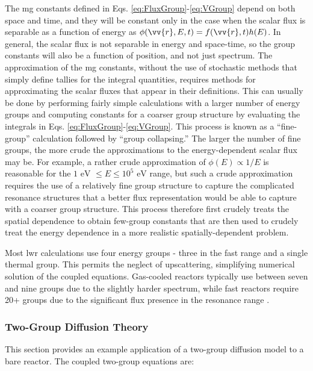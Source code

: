 The \gls{mg} constants defined in Eqs. \eqref{eq:FluxGroup}-\eqref{eq:VGroup} depend on both space and time, and they will be constant only in the case when the scalar flux is separable as a function of energy as \(\phi(\vv{r},E,t)=f(\vv{r},t)h(E)\). In general, the scalar flux is not separable in energy and space-time, so the group constants will also be a function of position, and not just spectrum. The approximation of the \gls{mg} constants, without the use of stochastic methods that simply define tallies for the integral quantities, requires methods for approximating the scalar fluxes that appear in their definitions. This can usually be done by performing fairly simple calculations with a larger number of energy groups and computing constants for a coarser group structure by evaluating the integrals in Eqs. \eqref{eq:FluxGroup}-\eqref{eq:VGroup}. This process is known as a ``fine-group'' calculation followed by ``group collapsing.'' The larger the number of fine groups, the more crude the approximations to the energy-dependent scalar flux may be. For example, a rather crude approximation of \(\phi(E)\propto1/E\) is reasonable for the \(1 \text{ eV }\le E\le 10^5 \text{ eV}\) range, but such a crude approximation requires the use of a relatively fine group structure to capture the complicated resonance structures that a better flux representation would be able to capture with a coarser group structure. This process therefore first crudely treats the spatial dependence to obtain few-group constants that are then used to crudely treat the energy dependence in a more realistic spatially-dependent problem.

Most \gls{lwr} calculations use four energy groups - three in the fast range and a single thermal group. This permits the neglect of upscattering, simplifying numerical solution of the coupled equations. Gas-cooled reactors typically use between seven and nine groups due to the slightly harder spectrum, while fast reactors require 20+ groups due to the significant flux presence in the resonance range \cite{duderstadt}.

\subsubsection{Two-Group Diffusion Theory}
\label{sec:TwoGroupDT}

This section provides an example application of a two-group diffusion model to a bare reactor. The coupled two-group equations are:

